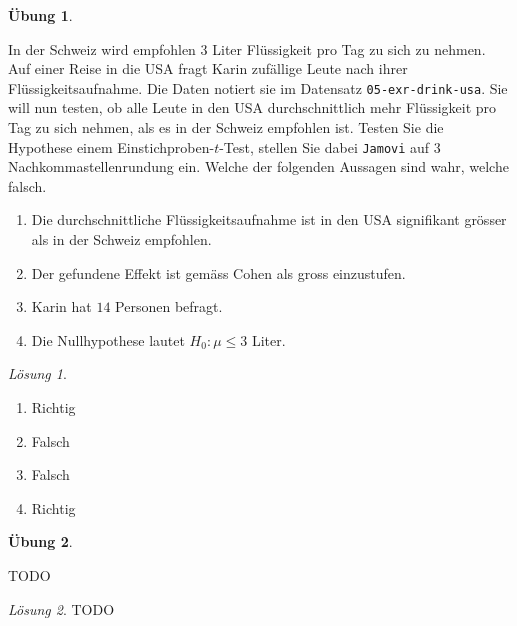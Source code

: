 \documentclass[
]{book}
\providecommand{\tightlist}{%
  \setlength{\itemsep}{0pt}\setlength{\parskip}{0pt}}
\theoremstyle{definition}
\theoremstyle{definition}
\theoremstyle{definition}
\newtheorem{exercise}{Übung}[chapter]
\theoremstyle{definition}
\theoremstyle{remark}
\newtheorem*{solution}{Lösung}
\begin{document}
\begin{exercise}
\protect\hypertarget{exr:test-drink-usa}{}\label{exr:test-drink-usa}

In der Schweiz wird empfohlen \(3\) Liter Flüssigkeit pro Tag zu sich zu nehmen. Auf einer Reise in die USA fragt Karin zufällige Leute nach ihrer Flüssigkeitsaufnahme. Die Daten notiert sie im Datensatz \texttt{05-exr-drink-usa}. Sie will nun testen, ob alle Leute in den USA durchschnittlich mehr Flüssigkeit pro Tag zu sich nehmen, als es in der Schweiz empfohlen ist. Testen Sie die Hypothese einem Einstichproben-\(t\)-Test, stellen Sie dabei \texttt{Jamovi} auf \(3\) Nachkommastellenrundung ein. Welche der folgenden Aussagen sind wahr, welche falsch.

\begin{enumerate}
\def\labelenumi{\alph{enumi})}
\tightlist
\item
  Die durchschnittliche Flüssigkeitsaufnahme ist in den USA signifikant grösser als in der Schweiz empfohlen.
\item
  Der gefundene Effekt ist gemäss Cohen als gross einzustufen.
\item
  Karin hat \(14\) Personen befragt.
\item
  Die Nullhypothese lautet \(H_0: \mu \leq 3\) Liter.
\end{enumerate}

\end{exercise}

\begin{solution}
\leavevmode

\begin{enumerate}
\def\labelenumi{\alph{enumi})}
\tightlist
\item
  Richtig
\item
  Falsch
\item
  Falsch
\item
  Richtig
\end{enumerate}

\end{solution}

\begin{exercise}
\protect\hypertarget{exr:98zvh3blbel}{}\label{exr:98zvh3blbel}\leavevmode

TODO

\end{exercise}

\begin{solution}
TODO
\end{solution}
\end{document}
